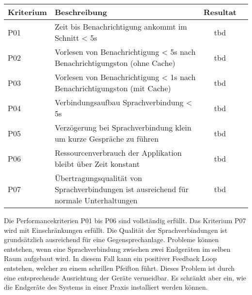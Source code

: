 \begin{table}[h]
    \centering
    \begin{tabular}{|l|p{11cm}|c|c|}
        \hline
        \textbf{Kriterium} & \textbf{Beschreibung} & \textbf{Resultat} \\
        \hline
        P01         & Zeit bis Benachrichtigung ankommt im Schnitt < 5s & tbd\\
        \hline
        P02         & Vorlesen von Benachrichtigung < 5s nach Benachrichtigungston (ohne Cache) & tbd\\
        \hline
        P03         & Vorlesen von Benachrichtigung < 1s nach Benachrichtigungston (mit Cache) & tbd\\
        \hline
        P04         & Verbindungsaufbau Sprachverbindung < 5s  & tbd\\
        \hline
        P05         & Verzögerung bei Sprachverbindung klein um kurze Gespräche zu führen & tbd\\
        \hline
        P06         & Ressourcenverbrauch der Applikation bleibt über Zeit konstant & tbd\\
        \hline
        P07         & Übertragungsqualität von Sprachverbindungen ist ausreichend für normale Unterhaltungen & tbd\\
        \hline
    \end{tabular}\label{tab:testplan_performance}
\end{table}

Die Performancekriterien P01 bis P06 sind vollständig erfüllt.
Das Kriterium P07 wird mit Einschränkungen erfüllt.
Die Qualität der Sprachverbindungen ist grundsätzlich ausreichend für eine Gegensprechanlage.
Probleme können entstehen, wenn eine Sprachverbindung zwischen zwei Endgeräten im selben Raum aufgebaut wird.
In diesem Fall kann ein positiver Feedback Loop entstehen, welcher zu einem schrillen Pfeifton führt.
Dieses Problem ist durch eine entsprechende Ausrichtung der Geräte vermeidbar.
Es schränkt aber ein, wie die Endgeräte des Systems in einer Praxis installiert werden können.

\clearpage
